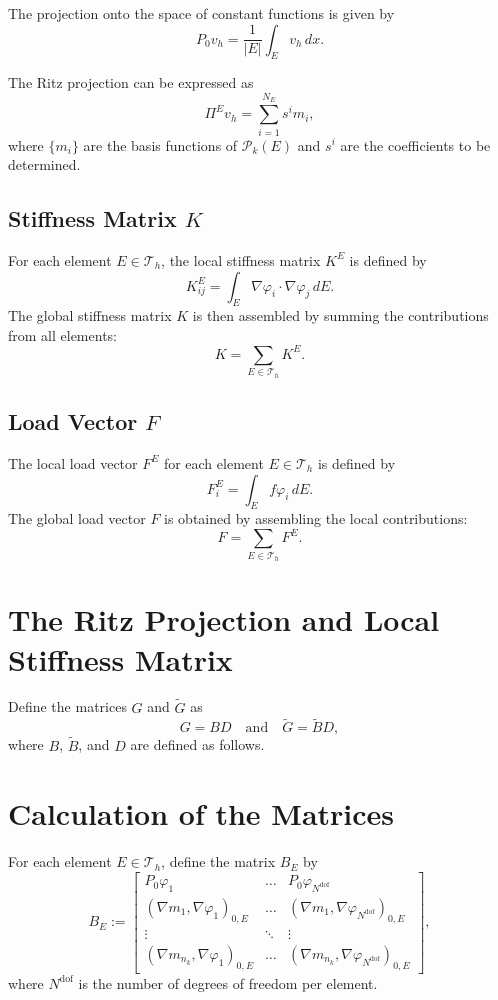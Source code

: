 \documentclass[class=article, crop=false]{standalone}
\begin{document}
The projection onto the space of constant functions is given by
\[
P_0 v_h = \frac{1}{|E|} \int_E v_h \, dx.
\]

The Ritz projection can be expressed as
\[
\Pi^E v_h = \sum_{i=1}^{N_E} s^i m_i,
\]
where $\{m_i\}$ are the basis functions of $\mathcal{P}_k(E)$ and $s^i$ are the coefficients to be determined.


\subsection{Stiffness Matrix $K$}
For each element $E \in \mathcal{T}_h$, the local stiffness matrix $K^E$ is defined by
\[
K^E_{ij} = \int_E \nabla \varphi_i \cdot \nabla \varphi_j \, dE.
\]
The global stiffness matrix $K$ is then assembled by summing the contributions from all elements:
\begin{equation}
    K = \sum_{E \in \mathcal{T}_h} K^E.
\end{equation}

\subsection{Load Vector $F$}
The local load vector $F^E$ for each element $E \in \mathcal{T}_h$ is defined by
\[
F^E_i = \int_E f \varphi_i \, dE.
\]
The global load vector $F$ is obtained by assembling the local contributions:
\begin{equation}
    F = \sum_{E \in \mathcal{T}_h} F^E.
\end{equation}

\section{The Ritz Projection and Local Stiffness Matrix}
Define the matrices $G$ and $\tilde{G}$ as
\[
G = BD \quad \text{and} \quad \tilde{G} = \tilde{B} D,
\]
where $B$, $\tilde{B}$, and $D$ are defined as follows.

\section{Calculation of the Matrices}
For each element $E \in \mathcal{T}_h$, define the matrix $B_E$ by
\[
B_E := \begin{bmatrix}
    P_0 \varphi_1 & \hdots & P_0 \varphi_{N^\text{dof}} \\
    (\nabla m_1, \nabla \varphi_1)_{0,E} & \hdots & (\nabla m_1, \nabla \varphi_{N^\text{dof}})_{0,E} \\
    \vdots & \ddots & \vdots \\
    (\nabla m_{n_k}, \nabla \varphi_1)_{0,E} & \hdots & (\nabla m_{n_k}, \nabla \varphi_{N^\text{dof}})_{0,E}
\end{bmatrix},
\]
where $N^\text{dof}$ is the number of degrees of freedom per element.
\end{document}

